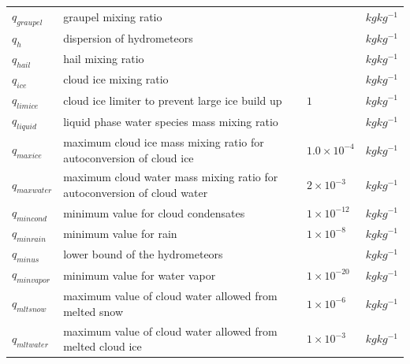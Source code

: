 \documentclass[letterpaper,titlepage,10pt]{article}
\numberwithin{equation}{section}
\begin{document}
\begin{appendices}
\begin{longtable}{p{}p{}p{}p{}}
	$q_{graupel}$      & graupel mixing ratio                                                                 &                            & $kg kg^{-1}$ \\
	$q_h$              & dispersion of hydrometeors                                                           &                            & $kg kg^{-1}$ \\
	$q_{hail}$         & hail mixing ratio                                                                    &                            & $kg kg^{-1}$ \\
	$q_{ice}$          & cloud ice mixing ratio                                                               &                            & $kg kg^{-1}$ \\
	$q_{limice}$       & cloud ice limiter to prevent large ice build up                                      & $1$                        & $kg kg^{-1}$ \\
	$q_{liquid}$       & liquid phase water species mass mixing ratio                                         &                            & $kg kg^{-1}$ \\
	$q_{maxice}$       & maximum cloud ice mass mixing ratio for autoconversion of cloud ice                  & $1.0 \times 10^{-4}$       & $kg kg^{-1}$ \\
	$q_{maxwater}$     & maximum cloud water mass mixing ratio for autoconversion of cloud water              & $2 \times 10^{-3}$         & $kg kg^{-1}$ \\
	$q_{mincond}$      & minimum value for cloud condensates                                                  & $1 \times 10^{-12}$        & $kg kg^{-1}$ \\
	$q_{minrain}$      & minimum value for rain                                                               & $1 \times 10^{-8}$         & $kg kg^{-1}$ \\
	$q_{minus}$        & lower bound of the hydrometeors                                                      &                            & $kg kg^{-1}$ \\
	$q_{minvapor}$     & minimum value for water vapor                                                        & $1 \times 10^{-20}$        & $kg kg^{-1}$ \\
	$q_{mltsnow}$      & maximum value of cloud water allowed from melted snow                                & $1 \times 10^{-6}$         & $kg kg^{-1}$ \\
	$q_{mltwater}$     & maximum value of cloud water allowed from melted cloud ice                           & $1 \times 10^{-3}$         & $kg kg^{-1}$ \\

\end{longtable}
\end{appendices}
\end{document}
